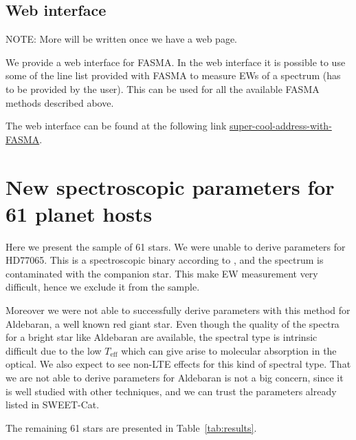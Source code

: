 \documentclass{aa}
\begin{document}
\subsection{Web interface}
\label{sub:Web interface}
NOTE: More will be written once we have a web page.

We provide a web interface for FASMA. In the web interface it is possible to use
some of the line list provided with FASMA to measure EWs of a spectrum (has to
be provided by the user). This can be used for all the available FASMA methods
described above.

The web interface can be found at the following link
\url{super-cool-address-with-FASMA}.



\section{New spectroscopic parameters for 61 planet hosts}
\label{sec:results}
Here we present the sample of 61 stars. We were unable to derive parameters for
HD77065. This is a spectroscopic binary according to \cite{Pourbaix2004}, and
the spectrum is contaminated with the companion star. This make EW measurement
very difficult, hence we exclude it from the sample.

Moreover we were not able to successfully derive parameters with this method for
Aldebaran, a well known red giant star. Even though the quality of the spectra
for a bright star like Aldebaran are available, the spectral type is intrinsic
difficult due to the low $T_\mathrm{eff}$ which can give arise to molecular
absorption in the optical. We also expect to see non-LTE effects for this kind
of spectral type. That we are not able to derive parameters for Aldebaran is not
a big concern, since it is well studied with other techniques, and we can trust
the parameters already listed in SWEET-Cat.

The remaining 61 stars are presented in Table~\ref{tab:results}.
\end{document}
